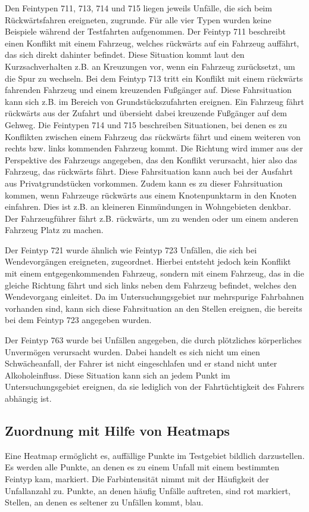 Den Feintypen 711, 713, 714 und 715 liegen jeweils Unfälle, die sich beim Rückwärtsfahren ereigneten, zugrunde. Für alle vier Typen wurden keine Beispiele während der Testfahrten aufgenommen. Der Feintyp 711 beschreibt einen Konflikt mit einem Fahrzeug, welches rückwärts auf ein Fahrzeug auffährt, das sich direkt dahinter befindet. Diese Situation kommt laut den Kurzsachverhalten z.B. an Kreuzungen vor, wenn ein Fahrzeug zurücksetzt, um die Spur zu wechseln. Bei dem Feintyp 713 tritt ein Konflikt mit einem rückwärts fahrenden Fahrzeug und einem kreuzenden Fußgänger auf. Diese Fahrsituation kann sich z.B. im Bereich von Grundstückszufahrten ereignen. Ein Fahrzeug fährt rückwärts aus der Zufahrt und übersieht dabei kreuzende Fußgänger auf dem Gehweg. Die Feintypen 714 und 715 beschreiben Situationen, bei denen es zu Konflikten zwischen einem Fahrzeug das rückwärts fährt und einem weiteren von rechts bzw. links kommenden Fahrzeug kommt. Die Richtung wird immer aus der Perspektive des Fahrzeugs angegeben, das den Konflikt verursacht, hier also das Fahrzeug, das rückwärts fährt. Diese Fahrsituation kann auch bei der Ausfahrt aus Privatgrundstücken vorkommen. Zudem kann es zu dieser Fahrsituation kommen, wenn Fahrzeuge rückwärts aus einem Knotenpunktarm in den Knoten einfahren. Dies ist z.B. an kleineren Einmündungen in Wohngebieten denkbar. Der Fahrzeugführer fährt z.B. rückwärts, um zu wenden oder um einem anderen Fahrzeug Platz zu machen.

Der Feintyp 721 wurde ähnlich wie Feintyp 723 Unfällen, die sich bei Wendevorgängen ereigneten, zugeordnet. Hierbei entsteht jedoch kein Konflikt mit einem entgegenkommenden Fahrzeug, sondern mit einem Fahrzeug, das in die gleiche Richtung fährt und sich links neben dem Fahrzeug befindet, welches den Wendevorgang einleitet. Da im Untersuchungsgebiet nur mehrspurige Fahrbahnen vorhanden sind, kann sich diese Fahrsituation an den Stellen ereignen, die bereits bei dem Feintyp 723 angegeben wurden.

Der Feintyp 763 wurde bei Unfällen angegeben, die durch plötzliches körperliches Unvermögen verursacht wurden. Dabei handelt es sich nicht um einen Schwächeanfall, der Fahrer ist nicht eingeschlafen und er stand nicht unter Alkoholeinfluss. Diese Situation kann sich an jedem Punkt im Untersuchungsgebiet ereignen, da sie lediglich von der Fahrtüchtigkeit des Fahrers abhängig ist.

\subsection{Zuordnung mit Hilfe von Heatmaps}\label{section:Heatmaps}
Eine Heatmap ermöglicht es, auffällige Punkte im Testgebiet bildlich darzustellen. Es werden alle Punkte, an denen es zu einem Unfall mit einem bestimmten Feintyp kam, markiert. Die Farbintensität nimmt mit der Häufigkeit der Unfallanzahl zu. Punkte, an denen häufig Unfälle auftreten, sind rot markiert, Stellen, an denen es seltener zu Unfällen kommt, blau.

